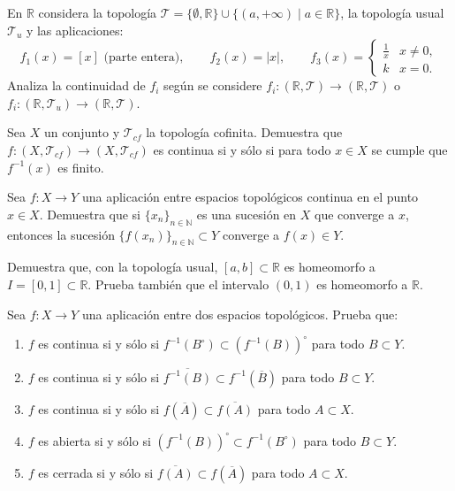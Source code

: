 \begin{ejer}[87]
En $\mathbb{R}$ considera la topología $\mathcal{T} = \{\emptyset, \mathbb{R}\} \cup \{(a, +\infty) \mid a \in \mathbb{R}\}$, la topología usual $\mathcal{T}_u$ y las aplicaciones:
\[
    f_1(x) = [x] \text{ (parte entera)}, \qquad f_2(x) = |x|, \qquad f_3(x) = \begin{cases} \frac{1}{x} & x \neq 0, \\ k & x = 0. \end{cases}
\]
Analiza la continuidad de $f_i$ según se considere $f_i \colon (\mathbb{R}, \mathcal{T}) \to (\mathbb{R}, \mathcal{T})$ o $f_i \colon (\mathbb{R}, \mathcal{T}_u) \to (\mathbb{R}, \mathcal{T})$.
\end{ejer}

\begin{ejer}[88]
Sea $X$ un conjunto y $\mathcal{T}_{cf}$ la topología cofinita. Demuestra que $f \colon (X, \mathcal{T}_{cf}) \to (X, \mathcal{T}_{cf})$ es continua si y sólo si para todo $x \in X$ se cumple que $f^{-1}(x)$ es finito.
\end{ejer}

\begin{ejer}[89]
Sea $f \colon X \to Y$ una aplicación entre espacios topológicos continua en el punto $x \in X$. Demuestra que si $\{x_n\}_{n \in \mathbb{N}}$ es una sucesión en $X$ que converge a $x$, entonces la sucesión $\{f(x_n)\}_{n \in \mathbb{N}} \subset Y$ converge a $f(x) \in Y$.
\end{ejer}

\begin{ejer}[90]
Demuestra que, con la topología usual, $[a,b] \subset \mathbb{R}$ es homeomorfo a $I = [0,1] \subset \mathbb{R}$. Prueba también que el intervalo $(0,1)$ es homeomorfo a $\mathbb{R}$.
\end{ejer}

\begin{ejer}[91]
Sea $f \colon X \to Y$ una aplicación entre dos espacios topológicos. Prueba que:
\begin{enumerate}
    \item[a)] $f$ es continua si y sólo si $f^{-1}(B^\circ) \subset (f^{-1}(B))^\circ$ para todo $B \subset Y$.
    \item[b)] $f$ es continua si y sólo si $\overline{f^{-1}(B)} \subset f^{-1}(\overline{B})$ para todo $B \subset Y$.
    \item[c)] $f$ es continua si y sólo si $f(\overline{A}) \subset \overline{f(A)}$ para todo $A \subset X$.
    \item[d)] $f$ es abierta si y sólo si $(f^{-1}(B))^\circ \subset f^{-1}(B^\circ)$ para todo $B \subset Y$.
    \item[e)] $f$ es cerrada si y sólo si $\overline{f(A)} \subset f(\overline{A})$ para todo $A \subset X$.
\end{enumerate}
\end{ejer}

